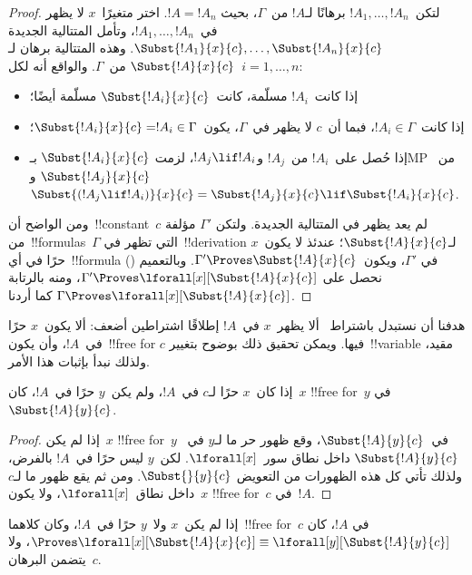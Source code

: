 \documentclass[../../../include/open-logic-section]{subfiles}
\begin{document}
\begin{proof}
لتكن~$!A_1,\ldots,!A_n$ برهانًا لـ$!A$ من~$\Gamma$، بحيث
$!A=!A_n$. اختر متغيرًا~$x$ لا يظهر في~$!A_1,\ldots,!A_n$، وتأمل
المتتالية الجديدة
$\Subst{!A_1}{x}{c},\ldots,\Subst{!A_n}{x}{c}$. وهذه المتتالية برهان
لـ$\Subst{!A}{x}{c}$ من~$\Gamma$. والواقع أنه لكل~$i=1,\ldots,n$:
\begin{itemize}
\item إذا كانت~$!A_i$ مسلّمة، كانت~$\Subst{!A_i}{x}{c}$ مسلّمة أيضًا؛
\item إذا كانت~$!A_i \in \Gamma$، فبما أن~$c$ لا يظهر في~$\Gamma$،
يكون~$\Subst{!A_i}{x}{c} = !A_i \in \Gamma$؛
\item إذا حُصل على~$!A_i$ من~$!A_j$ و$!A_j \lif !A_i$، لزمت
$\Subst{!A_i}{x}{c}$ بـMP من~$\Subst{!A_j}{x}{c}$ و
$\Subst{(!A_j \lif !A_i)}{x}{c} = \Subst{!A_j}{x}{c} \lif
\Subst{!A_i}{x}{c}$.
\end{itemize}
ومن الواضح أن~!!{constant}~$c$ لم يعد يظهر في المتتالية الجديدة. ولتكن
$\Gamma'$ مؤلفة من~!!{formula}s~$\Gamma$ التي تظهر في~!!{derivation}
لـ$\Subst{!A}{x}{c}$؛ عندئذ لا يكون~$x$ حرًا في أي~!!{formula} في
$\Gamma'$، ويكون~$\Gamma' \Proves \Subst{!A}{x}{c}$. وبالتعميم
() نحصل على
$\Gamma' \Proves \lforall[x][\Subst{!A}{x}{c}]$، ومنه بالرتابة
$\Gamma \Proves \lforall[x][\Subst{!A}{x}{c}]$ كما أردنا.
\end{proof}

\begin{explain}
هدفنا أن نستبدل باشتراط~ ألا يظهر~$x$ في~$!A$
إطلاقًا اشتراطين أضعف: ألا يكون~$x$ حرًا في~$!A$، وأن يكون~!!{free for}
$c$ فيها. ويمكن تحقيق ذلك بوضوح بتغيير~!!{variable} مقيد، ولذلك نبدأ
بإثبات هذا الأمر.
\end{explain}

\begin{lem}
إذا كان~$x$ حرًا لـ$c$ في~$!A$، ولم يكن~$y$ حرًا في~$!A$، كان~$x$
!!{free for}~$y$ في~$\Subst{!A}{y}{c}$.
\end{lem}

\begin{proof}
إذا لم يكن~$x$ !!{free for}~$y$ في~$\Subst{!A}{y}{c}$، وقع ظهور حر
ما لـ$y$ في~$\Subst{!A}{y}{c}$ داخل نطاق سور~$\lforall[x]$. لكن~$y$
ليس حرًا في~$!A$ بالفرض، ولذلك تأتي كل هذه الظهورات من التعويض
$\Subst{}{y}{c}$. ومن ثم يقع ظهور ما لـ$c$ داخل نطاق~$\lforall[x]$،
ولا يكون~$x$ !!{free for}~$c$ في~$!A$.
\end{proof}

\begin{lem}
إذا لم يكن~$x$ ولا~$y$ حرًا في~$!A$، وكان كلاهما~!!{free for}~$c$ في
$!A$، كان
$\Proves \lforall[x][\Subst{!A}{x}{c}] \equiv
\lforall[y][\Subst{!A}{y}{c}]$، ولا يتضمن البرهان~$c$.
\end{lem}
\end{document}
